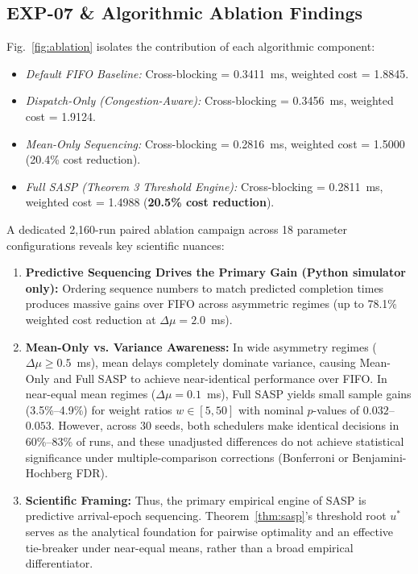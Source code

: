 \documentclass[10pt,journal,compsoc]{IEEEtran}
\begin{document}
\subsection{EXP-07 \& Algorithmic Ablation Findings}
Fig.~\ref{fig:ablation} isolates the contribution of each algorithmic component:
\begin{itemize}
    \item \emph{Default FIFO Baseline:} Cross-blocking = 0.3411~ms, weighted cost = 1.8845.
    \item \emph{Dispatch-Only (Congestion-Aware):} Cross-blocking = 0.3456~ms, weighted cost = 1.9124.
    \item \emph{Mean-Only Sequencing:} Cross-blocking = 0.2816~ms, weighted cost = 1.5000 (20.4\% cost reduction).
    \item \emph{Full SASP (Theorem 3 Threshold Engine):} Cross-blocking = 0.2811~ms, weighted cost = 1.4988 (\textbf{20.5\% cost reduction}).
\end{itemize}

A dedicated 2,160-run paired ablation campaign across 18 parameter configurations reveals key scientific nuances:
\begin{enumerate}
    \item \textbf{Predictive Sequencing Drives the Primary Gain (Python simulator only):} Ordering sequence numbers to match predicted completion times produces massive gains over FIFO across asymmetric regimes (up to 78.1\% weighted cost reduction at $\Delta\mu = 2.0$~ms).
    \item \textbf{Mean-Only vs. Variance Awareness:} In wide asymmetry regimes ($\Delta\mu \ge 0.5$~ms), mean delays completely dominate variance, causing Mean-Only and Full SASP to achieve near-identical performance over FIFO. In near-equal mean regimes ($\Delta\mu = 0.1$~ms), Full SASP yields small sample gains (3.5\%--4.9\%) for weight ratios $w \in [5, 50]$ with nominal $p$-values of $0.032$--$0.053$. However, across 30 seeds, both schedulers make identical decisions in 60\%--83\% of runs, and these unadjusted differences do not achieve statistical significance under multiple-comparison corrections (Bonferroni or Benjamini-Hochberg FDR).
    \item \textbf{Scientific Framing:} Thus, the primary empirical engine of SASP is predictive arrival-epoch sequencing. Theorem~\ref{thm:sasp}'s threshold root $u^*$ serves as the analytical foundation for pairwise optimality and an effective tie-breaker under near-equal means, rather than a broad empirical differentiator.
\end{enumerate}
\end{document}
